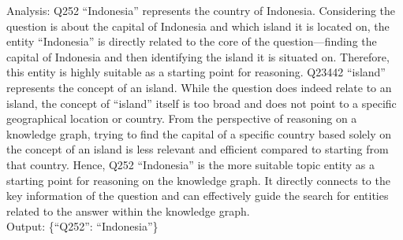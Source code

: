 \documentclass[11pt,UTF8,fontset=fandol]{ctexart}
\begin{document}
\begin{promptbox}
Analysis: Q252 ``Indonesia'' represents the country of Indonesia. Considering the question is about the capital of Indonesia and which island it is located on, the entity ``Indonesia'' is directly related to the core of the question---finding the capital of Indonesia and then identifying the island it is situated on. Therefore, this entity is highly suitable as a starting point for reasoning. Q23442 ``island'' represents the concept of an island. While the question does indeed relate to an island, the concept of ``island'' itself is too broad and does not point to a specific geographical location or country. From the perspective of reasoning on a knowledge graph, trying to find the capital of a specific country based solely on the concept of an island is less relevant and efficient compared to starting from that country. Hence, Q252 ``Indonesia'' is the more suitable topic entity as a starting point for reasoning on the knowledge graph. It directly connects to the key information of the question and can effectively guide the search for entities related to the answer within the knowledge graph.\\
Output: \{``Q252'': ``Indonesia''\}
\end{promptbox}
\end{document}
